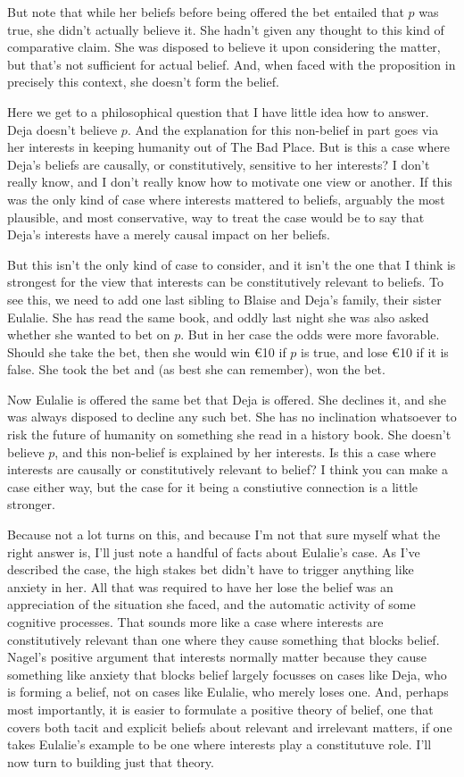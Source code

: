 \documentclass[11pt,]{book}
\begin{document}
But note that while her beliefs before being offered the bet entailed that \(p\) was true, she didn't actually believe it. She hadn't given any thought to this kind of comparative claim. She was disposed to believe it upon considering the matter, but that's not sufficient for actual belief. And, when faced with the proposition in precisely this context, she doesn't form the belief.

Here we get to a philosophical question that I have little idea how to answer. Deja doesn't believe \(p\). And the explanation for this non-belief in part goes via her interests in keeping humanity out of The Bad Place. But is this a case where Deja's beliefs are causally, or constitutively, sensitive to her interests? I don't really know, and I don't really know how to motivate one view or another. If this was the only kind of case where interests mattered to beliefs, arguably the most plausible, and most conservative, way to treat the case would be to say that Deja's interests have a merely causal impact on her beliefs.

But this isn't the only kind of case to consider, and it isn't the one that I think is strongest for the view that interests can be constitutively relevant to beliefs. To see this, we need to add one last sibling to Blaise and Deja's family, their sister Eulalie. She has read the same book, and oddly last night she was also asked whether she wanted to bet on \(p\). But in her case the odds were more favorable. Should she take the bet, then she would win €10 if \(p\) is true, and lose €10 if it is false. She took the bet and (as best she can remember), won the bet.

Now Eulalie is offered the same bet that Deja is offered. She declines it, and she was always disposed to decline any such bet. She has no inclination whatsoever to risk the future of humanity on something she read in a history book. She doesn't believe \(p\), and this non-belief is explained by her interests. Is this a case where interests are causally or constitutively relevant to belief? I think you can make a case either way, but the case for it being a constiutive connection is a little stronger.

Because not a lot turns on this, and because I'm not that sure myself what the right answer is, I'll just note a handful of facts about Eulalie's case. As I've described the case, the high stakes bet didn't have to trigger anything like anxiety in her. All that was required to have her lose the belief was an appreciation of the situation she faced, and the automatic activity of some cognitive processes. That sounds more like a case where interests are constitutively relevant than one where they cause something that blocks belief. Nagel's positive argument that interests normally matter because they cause something like anxiety that blocks belief largely focusses on cases like Deja, who is forming a belief, not on cases like Eulalie, who merely loses one. And, perhaps most importantly, it is easier to formulate a positive theory of belief, one that covers both tacit and explicit beliefs about relevant and irrelevant matters, if one takes Eulalie's example to be one where interests play a constitutuve role. I'll now turn to building just that theory.
\end{document}

